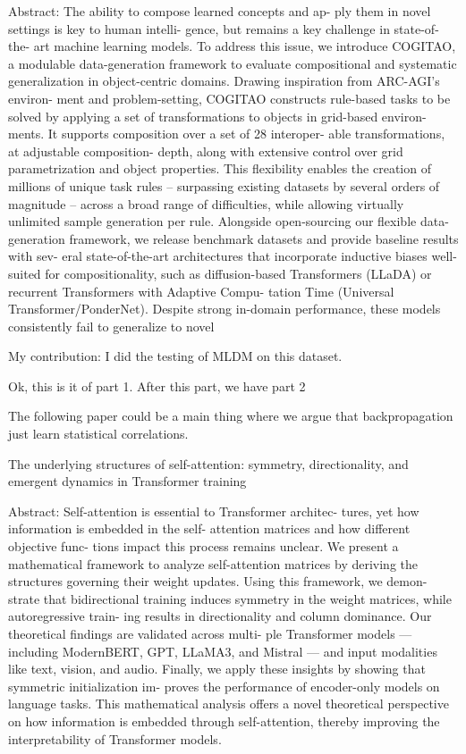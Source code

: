 Abstract: The ability to compose learned concepts and ap-
ply them in novel settings is key to human intelli-
gence, but remains a key challenge in state-of-the-
art machine learning models.
To address this issue, we introduce COGITAO, a
modulable data-generation framework to evaluate
compositional and systematic generalization in
object-centric domains.
Drawing inspiration from ARC-AGI’s environ-
ment and problem-setting, COGITAO constructs
rule-based tasks to be solved by applying a set of
transformations to objects in grid-based environ-
ments.
It supports composition over a set of 28 interoper-
able transformations, at adjustable composition-
depth, along with extensive control over grid
parametrization and object properties.
This flexibility enables the creation of millions of
unique task rules – surpassing existing datasets by
several orders of magnitude – across a broad range
of difficulties, while allowing virtually unlimited
sample generation per rule.
Alongside open-sourcing our flexible data-
generation framework, we release benchmark
datasets and provide baseline results with sev-
eral state-of-the-art architectures that incorporate
inductive biases well-suited for compositionality,
such as diffusion-based Transformers (LLaDA)
or recurrent Transformers with Adaptive Compu-
tation Time (Universal Transformer/PonderNet).
Despite strong in-domain performance, these
models consistently fail to generalize to novel


My contribution: I did the testing of MLDM on this dataset.


Ok, this is it of part 1. After this part, we have part 2

The following paper could be a main thing where we argue that backpropagation just learn statistical correlations.

The underlying structures of self-attention: symmetry, directionality, and emergent dynamics in Transformer training

Abstract: Self-attention is essential to Transformer architec-
tures, yet how information is embedded in the self-
attention matrices and how different objective func-
tions impact this process remains unclear. We present
a mathematical framework to analyze self-attention
matrices by deriving the structures governing their
weight updates. Using this framework, we demon-
strate that bidirectional training induces symmetry
in the weight matrices, while autoregressive train-
ing results in directionality and column dominance.
Our theoretical findings are validated across multi-
ple Transformer models — including ModernBERT,
GPT, LLaMA3, and Mistral — and input modalities
like text, vision, and audio. Finally, we apply these
insights by showing that symmetric initialization im-
proves the performance of encoder-only models on
language tasks. This mathematical analysis offers a
novel theoretical perspective on how information is
embedded through self-attention, thereby improving
the interpretability of Transformer models.

